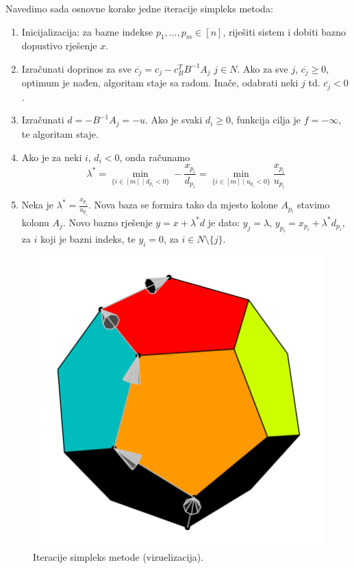 \documentclass[a4paper, utf8, 11pt, colorlinks]{book}
\begin{document}
Navedimo sada osnovne korake jedne iteracije simpleks metoda:
\begin{enumerate}
    \item Inicijalizacija: za bazne indekse $p_1,\ldots,p_m \in [n]$, riješiti sistem i dobiti bazno dopustivo rješenje $x$. 
    \item Izračunati doprinos za sve $\overline{c_j} = c_j - c_B^T B^{-1}A_j $
          $j \in N$. Ako za sve $j$, $\overline{c_j} \geq 0$, optimum je nađen, algoritam staje sa radom. Inače, odabrati neki $j$  td. $\overline{c_j}<0$.
    \item Izračunati $d = -B^{-1}A_j = -u$. Ako je svaki $d_i \geq  0$, funkcija cilja je $f = - \infty$, te algoritam staje. 
    \item Ako je za neki $i$, $d_i < 0$, onda računamo 
             $$ \lambda^* = \min_{ \{i\in [m] \mid d_{p_i} < 0  \}} - \frac{x_{p_i}}{d_{p_i}} =  \min_{ \{i\in [m] \mid u_{p_i} < 0  \}} \frac{x_{p_i}}{u_{p_i}} $$
    \item Neka je $\lambda^* = \frac{x_{p_i}}{u_{p_i}}$. Nova baza se formira tako da mjesto kolone $A_{p_l}$ stavimo kolonu $A_j$. Novo bazno rješenje 
    $y = x + \lambda^*d $ je dato: $y_j = \lambda$, $y_{p_i} = x_{p_i} + \lambda^* d_{p_i}$, za $i$ koji je bazni indeks, te $y_i = 0$, za $i \in N \setminus \{j\}$. 
\end{enumerate}

\begin{figure}[!ht]
	\centering
   \includegraphics[scale=0.25]{moving_simplex.png}
    \caption{Iteracije simpleks metode (vizuelizacija).}
    \label{fig:simpleks-visuelisation}
\end{figure}
\end{document}
